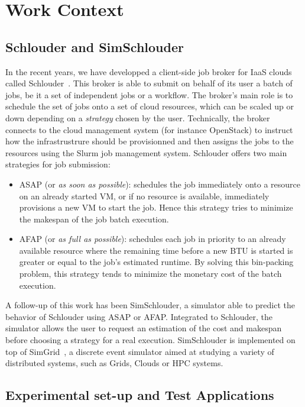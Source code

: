 \documentclass[10pt,conference,compsocconf]{IEEEtran}
\begin{document}
\section{Work Context}

\subsection{Schlouder and SimSchlouder}
In the recent years, we have developped a client-side job broker for IaaS clouds
called Schlouder~\cite{Michon17}. This broker is able to submit on behalf of its
user a  batch of  jobs, be  it a  set of  independent jobs  or a  workflow.  The
broker's main role is to schedule the set of jobs onto a set of cloud resources,
which can  be scaled  up or down  depending on a  \emph{strategy} chosen  by the
user.   Technically, the  broker connects  to the  cloud management  system (for
instance OpenStack) to  instruct how the infrastrustrure  should be provisionned
and  then assigns  the jobs  to  the resources  using the  Slurm job  management
system.  Schlouder offers two main strategies for job submission:
\begin{itemize}
\item ASAP (or \textit{as soon as possible}): schedules the job immediately onto
  a  resource  on  an already  started  VM,  or  if  no resource  is  available,
  immediately provisions a  new VM to start the job.   Hence this strategy tries
  to minimize the makespan of the job batch execution.

\item AFAP (or \textit{as full as  possible}): schedules each job in priority to
  an already  available resource where  the remaining time  before a new  BTU is
  started is greater or equal to the job's estimated runtime. By solving this 
 bin-packing problem, this strategy tends to minimize the monetary cost of the
 batch execution.
\end{itemize}

A follow-up of this work has been  SimSchlouder, a simulator able to predict the
behavior of Schlouder using ASAP or AFAP. Integrated to Schlouder, the simulator
allows  the user  to  request an  estimation  of the  cost  and makespan  before
choosing a strategy for a real execution.  SimSchlouder is implemented on top of
SimGrid~\cite{simgrid}, a discrete  event simulator aimed at  studying a variety
of distributed systems, such as Grids, Clouds or HPC systems.

\subsection{Experimental set-up and Test Applications}
\end{document}
